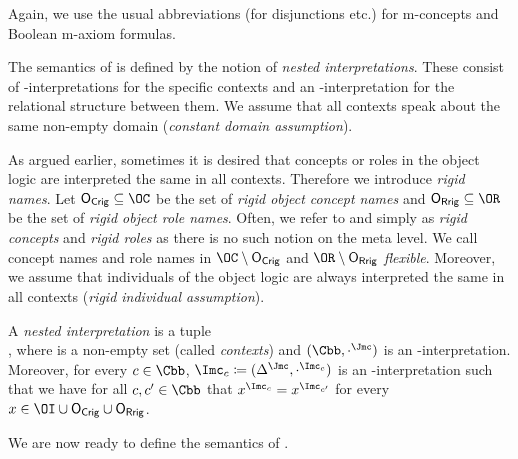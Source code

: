 Again, we use the usual abbreviations (for disjunctions etc.) for m-concepts and
Boolean m-axiom formulas.

The semantics of \LMLO is defined by the notion of \emph{nested interpretations}.  These consist of
\Osig-interpretations for the specific contexts and an \Msig-interpretation for the relational
structure between them.  We assume that all contexts speak about the same non-empty domain
(\emph{constant domain assumption}). 

As argued earlier, sometimes it is desired that concepts or roles in the object logic are
interpreted the same in all contexts. Therefore we introduce \emph{rigid names}. Let
$\OCR\subseteq\OC$ be the set of \emph{rigid object concept names} and $\ORR\subseteq\OR$ be the set
of \emph{rigid object role names}.
%
Often, we refer to \OCR and \ORR simply as \emph{rigid concepts} and \emph{rigid roles} as there is
no such notion on the meta level.
%
We call concept names and role names in $\OC\setminus\OCR$ and $\OR\setminus\ORR$ \emph{flexible}.
%
Moreover, we assume that individuals of the object logic are always interpreted the same in all
contexts (\emph{rigid individual assumption}). 

\begin{definition}\label{def:nested-interpretation}
  A \emph{nested interpretation} is a tuple \\ \JJ, where \Cbb is a non-empty set (called
  \emph{contexts}) and $(\Cbb,\cdot^\J)$ is an \Msig-interpretation.
  Moreover, for every $c\in\Cbb$, $\I_c\coloneqq(\Delta^{\J},\cdot^{\I_c})$ is an \Osig-interpretation
  such that we have for all $c,c'\in\Cbb$ that $x^{\I_{c}}=x^{\I_{c'}}$ for every
  $x\in\OI\cup\OCR\cup\ORR$.
\end{definition}

We are now ready to define the semantics of \LMLO.


